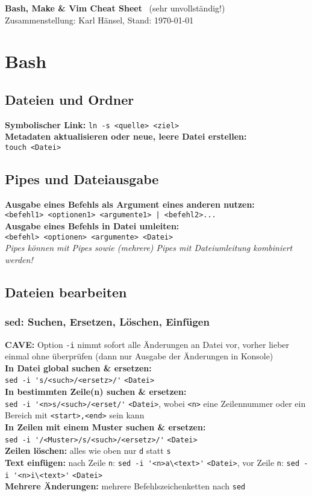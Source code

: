 \documentclass[a4paper, twocolumn]{scrarticle}
\begin{document}
{\Huge  \textbf{\textsf{Bash, Make \& Vim Cheat Sheet}}} \ {\tiny (sehr unvollständig!)}\\
Zusammenstellung: Karl Hänsel, Stand: \today

\section{Bash}
\subsection{Dateien und Ordner}
\textbf{Symbolischer Link:} \lstinline|ln -s <quelle> <ziel>|\\
\textbf{Metadaten aktualisieren oder neue, leere Datei erstellen:}\\
\lstinline|touch <Datei>|

\subsection{Pipes und Dateiausgabe}
\textbf{Ausgabe eines Befehls als Argument eines anderen nutzen:} \\ \lstinline!<befehl1> <optionen1> <argumente1> | <befehl2>...!\\
\textbf{Ausgabe eines Befehls in Datei umleiten:}\\
\lstinline|<befehl> <optionen> <argumente> <Datei> |\\
\textit{Pipes können mit Pipes sowie (mehrere) Pipes mit Dateiumleitung kombiniert werden!}

\subsection{Dateien bearbeiten}
\subsubsection{sed: Suchen, Ersetzen, Löschen, Einfügen}
\textbf{CAVE:} Option \lstinline|-i| nimmt sofort alle Änderungen an Datei vor, vorher lieber einmal ohne überprüfen (dann nur Ausgabe der Änderungen in Konsole)\\
\textbf{In Datei global suchen \& ersetzen:}\\\lstinline|sed -i 's/<such>/<ersetz>/'| \lstinline|<Datei>|\\
\textbf{In bestimmten Zeile(n) suchen \& ersetzen:}\\ \lstinline|sed -i '<n>s/<such>/<erset/'| \lstinline|<Datei>|, wobei \lstinline|<n>| eine Zeilennummer oder ein Bereich mit \lstinline|<start>,<end>| sein kann\\
\textbf{In Zeilen mit einem Muster suchen \& ersetzen:}\\ \lstinline|sed -i '/<Muster>/s/<such>/<ersetz>/'| \lstinline|<Datei>|\\
\textbf{Zeilen löschen:} alles wie oben nur \lstinline|d| statt \lstinline|s|\\
\textbf{Text einfügen:} nach Zeile \lstinline|n|: \lstinline|sed -i '<n>a\<text>'| \lstinline|<Datei>|, vor Zeile \lstinline|n|: \lstinline|sed -i '<n>i\<text>'| \lstinline|<Datei>|\\
\textbf{Mehrere Änderungen:} mehrere Befehlszeichenketten nach \lstinline|sed|
\end{document}

